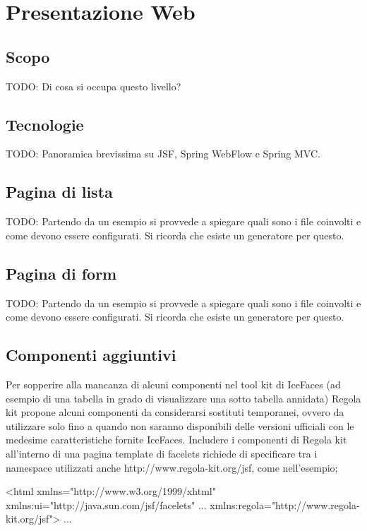 \chapter{Presentazione Web}

\section{Scopo}
TODO: Di cosa si occupa questo livello?

\section{Tecnologie}
TODO: Panoramica brevissima su JSF, Spring WebFlow e Spring MVC.

\section{Pagina di lista}
TODO: Partendo da un esempio si provvede a spiegare quali sono i file coinvolti e come devono essere configurati. Si ricorda che esiste un generatore per questo.

\section{Pagina di form}
TODO: Partendo da un esempio si provvede a spiegare quali sono i file coinvolti e come devono essere configurati. Si ricorda che esiste un generatore per questo.

\section{Componenti aggiuntivi}
Per sopperire alla mancanza di alcuni componenti nel tool kit di IceFaces (ad esempio di una tabella  in grado di visualizzare una sotto tabella annidata) Regola kit propone alcuni componenti da considerarsi sostituti temporanei, ovvero da utilizzare solo fino a quando non saranno disponibili delle versioni ufficiali con le medesime caratteristiche fornite IceFaces.
Includere i componenti di Regola kit all'interno di una pagina template di facelets richiede di specificare tra i namespace utilizzati anche http://www.regola-kit.org/jsf, come nell'esempio;

\begin{xml}
<html xmlns="http://www.w3.org/1999/xhtml"
  xmlns:ui="http://java.sun.com/jsf/facelets"
  ...
  xmlns:regola="http://www.regola-kit.org/jsf">
...
\end{xml}


